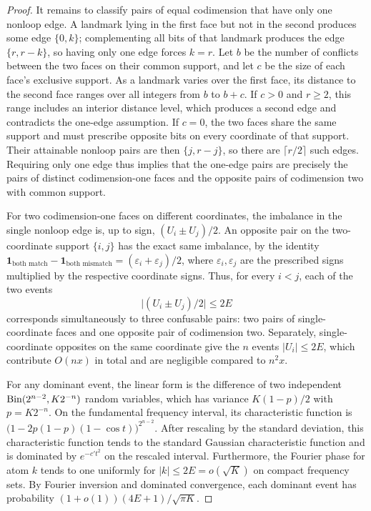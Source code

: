 \begin{proof}
It remains to classify pairs of equal codimension that have only one nonloop
edge. A landmark lying in the first face but not in the second produces some
edge \(\{0,k\}\); complementing all bits of that landmark produces the edge
\(\{r,r-k\}\), so having only one edge forces \(k=r\). Let \(b\) be the number
of conflicts between the two faces on their common support, and let \(c\) be
the size of each face's exclusive support. As a landmark varies over the first
face, its distance to the second face ranges over all integers from \(b\) to
\(b+c\). If \(c>0\) and \(r\ge2\), this range includes an interior distance
level, which produces a second edge and contradicts the one-edge assumption.
If \(c=0\), the two faces share the same support and must prescribe opposite
bits on every coordinate of that support. Their attainable nonloop pairs are
then \(\{j,r-j\}\), so there are \(\lceil r/2\rceil\) such edges. Requiring
only one edge thus implies that the one-edge pairs are precisely the pairs of
distinct codimension-one faces and the opposite pairs of codimension two with
common support.

For two codimension-one faces on different coordinates, the imbalance in the
single nonloop edge is, up to sign, \((U_i\pm U_j)/2\). An opposite pair on
the two-coordinate support \(\{i,j\}\) has the exact same imbalance, by the
identity
\(\mathbf1_{\text{both match}}-\mathbf1_{\text{both mismatch}}
=(\varepsilon_i+\varepsilon_j)/2\),
where \(\varepsilon_i,\varepsilon_j\) are the prescribed signs multiplied by
the respective coordinate signs. Thus, for every \(i<j\), each of the two
events
\[
 \big| (U_i\pm U_j)/2\big|\le 2E
\]
corresponds simultaneously to three confusable pairs: two pairs of
single-coordinate faces and one opposite pair of codimension two. Separately,
single-coordinate opposites on the same coordinate give the \(n\) events
\(|U_i|\le2E\), which contribute \(O(nx)\) in total and are negligible
compared to \(n^2x\).

For any dominant event, the linear form is the difference of two independent
\(\operatorname{Bin}(2^{n-2},K2^{-n})\) random variables, which has variance \(K(1-p)/2\)
with \(p=K2^{-n}\). On the fundamental frequency interval, its characteristic
function is \(\big(1-2p(1-p)(1-\cos t)\big)^{2^{n-2}}\). After rescaling by
the standard deviation, this characteristic function tends to the standard
Gaussian characteristic function and is dominated by \(e^{-c't^2}\) on the
rescaled interval. Furthermore, the Fourier phase for atom \(k\) tends to one
uniformly for \(|k|\le2E=o(\sqrt K)\) on compact frequency sets. By Fourier
inversion and dominated convergence, each dominant event has probability
\((1+o(1))(4E+1)/\sqrt{\pi K}\).


\end{proof}
